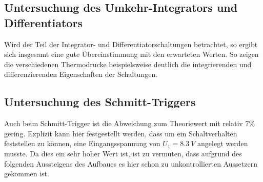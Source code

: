 \subsection*{Untersuchung des Umkehr-Integrators und Differentiators}
Wird der Teil der Integrator- und Differentiatorschaltungen betrachtet, so ergibt sich insgesamt eine gute Übereinstimmung mit den erwarteten Werten. So zeigen die verschiedenen Thermodrucke beispielsweise deutlich die integrierenden und differenzierenden Eigenschaften der Schaltungen.\\
\subsection*{Untersuchung des Schmitt-Triggers}
Auch beim Schmitt-Trigger ist die Abweichung zum Theoriewert mit relativ 7$\%$ gering. Explizit kann hier festgestellt werden, dass um ein Schaltverhalten feststellen zu können, eine Eingangsspannung von $U_1=\SI{8,3}{V}$ angelegt werden musste. Da dies ein sehr hoher Wert ist, ist zu vermuten, dass aufgrund des folgenden Aussteigens des Aufbaues es hier schon zu unkontrollierten Aussetzern gekommen ist.
